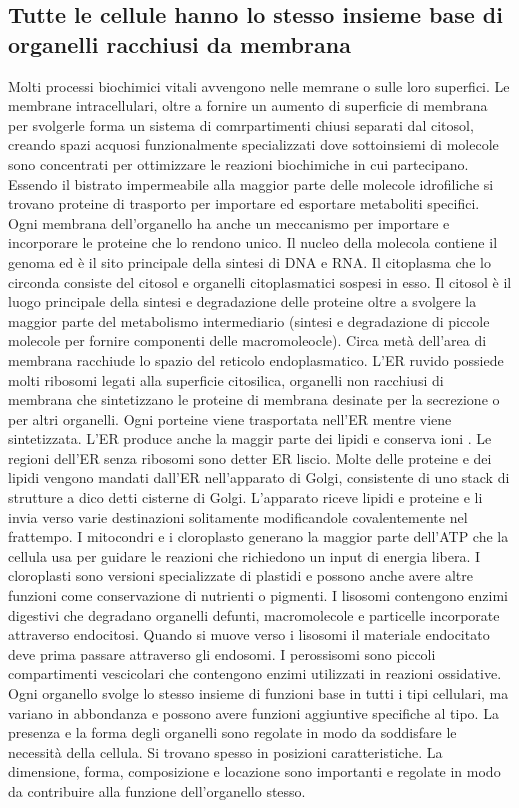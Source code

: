 \subsection{Tutte le cellule hanno lo stesso insieme base di organelli racchiusi da membrana}
Molti processi biochimici vitali avvengono nelle memrane o sulle loro superfici. Le membrane intracellulari, oltre a fornire un aumento di superficie di membrana per svolgerle forma
un sistema di comrpartimenti chiusi separati dal citosol, creando spazi acquosi funzionalmente specializzati dove sottoinsiemi di molecole sono concentrati per ottimizzare le reazioni
biochimiche in cui partecipano. Essendo il bistrato impermeabile alla maggior parte delle molecole idrofiliche si trovano proteine di trasporto per importare ed esportare metaboliti
specifici. Ogni membrana dell'organello ha anche un meccanismo per importare e incorporare le proteine che lo rendono unico. Il nucleo della molecola contiene il genoma ed \`e il sito
principale della sintesi di DNA e RNA. Il citoplasma che lo circonda consiste del citosol e organelli citoplasmatici sospesi in esso. Il citosol \`e il luogo principale della sintesi
e degradazione delle proteine oltre a svolgere la maggior parte del metabolismo intermediario (sintesi e degradazione di piccole molecole per fornire componenti delle macromoleocle). 
Circa met\`a dell'area di membrana racchiude lo spazio del reticolo endoplasmatico. L'ER ruvido possiede molti ribosomi legati alla superficie citosilica, organelli non racchiusi di 
membrana che sintetizzano le proteine di membrana desinate per la secrezione o per altri organelli. Ogni porteine viene trasportata nell'ER mentre viene sintetizzata. L'ER produce anche
la maggir parte dei lipidi e conserva ioni . Le regioni dell'ER senza ribosomi sono detter ER liscio. Molte delle proteine e dei lipidi vengono mandati dall'ER nell'apparato
di Golgi, consistente di uno stack di strutture a dico detti cisterne di Golgi. L'apparato riceve lipidi e proteine e li invia verso varie destinazioni solitamente modificandole 
covalentemente nel frattempo. I mitocondri e i cloroplasto generano la maggior parte dell'ATP che la cellula usa per guidare le reazioni che richiedono un input di energia libera. I 
cloroplasti sono versioni specializzate di plastidi e possono anche avere altre funzioni come conservazione di nutrienti o pigmenti. I lisosomi contengono enzimi digestivi che degradano
organelli defunti, macromolecole e particelle incorporate attraverso endocitosi. Quando si muove verso i lisosomi il materiale endocitato deve prima passare attraverso gli endosomi. 
I perossisomi sono piccoli compartimenti vescicolari che contengono enzimi utilizzati in reazioni ossidative. Ogni organello svolge lo stesso insieme di funzioni base in tutti i tipi
cellulari, ma variano in abbondanza e possono avere funzioni aggiuntive specifiche al tipo. La presenza e la forma degli organelli sono regolate in modo da soddisfare le necessit\`a 
della cellula. Si trovano spesso in posizioni caratteristiche. La dimensione, forma, composizione e locazione sono importanti e regolate in modo da contribuire alla funzione 
dell'organello stesso.
